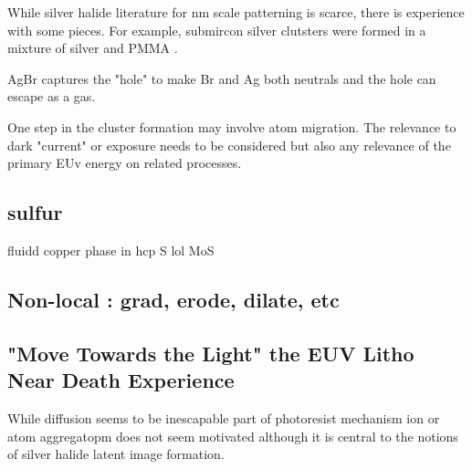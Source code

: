 

While silver halide literature for nm scale patterning is scarce,
there is experience with some pieces. For example, submircon silver
clutsters were formed in a mixture of silver and PMMA
\cite{PMC4820741}.


AgBr captures the "hole" to make Br and Ag both neutrals and the
hole can escape as a gas. 

One step in the cluster formation may involve atom migration.
The relevance to dark "current" or exposure needs to be considered
but also any relevance of the primary EUv energy on related
processes. 


\subsection{sulfur}

fluidd copper phase in hcp S lol 
MoS

\subsection{Non-local : grad, erode, dilate, etc }


\subsection{"Move Towards the Light" the EUV Litho Near Death Experience}

While diffusion seems to be inescapable part of photoresist mechanism
ion or atom aggregatopm does not seem motivated although it
is central to the notions of silver halide latent image formation.






